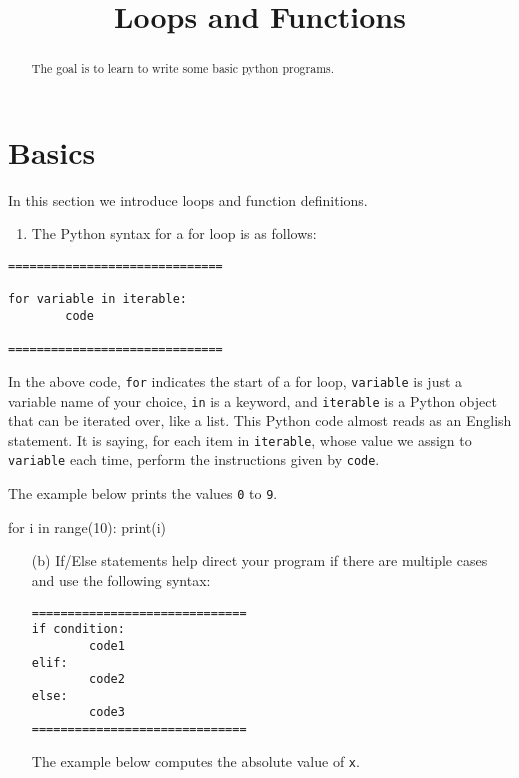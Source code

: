 \documentclass{ximera}
\title{Loops and Functions}
\begin{document}
\begin{abstract}
The goal is to learn to write some basic python programs.
\end{abstract}
\maketitle

\section{Basics}

In this section we introduce loops and function definitions.

	\begin{enumerate}
        	\item The Python syntax for a for loop is as follows:
	\end{enumerate}
\begin{verbatim}
==============================

for variable in iterable:
        code

==============================
\end{verbatim}

In the above code, \verb|for| indicates the start of a for loop, \verb|variable| is just a variable name of your choice, \verb|in| is a keyword, and \verb|iterable| is a Python object that can be iterated over, like a list. This Python code almost reads as an English statement. It is saying, for each item in \verb|iterable|, whose value we assign to \verb|variable| each time, perform the instructions given by \verb|code|.

The example below prints the values \verb|0| to \verb|9|.

\begin{sageCell}
for i in range(10):
        print(i)
\end{sageCell}

	\begin{enumerate}
		\item[(b)] If/Else statements help direct your program if there are multiple cases and use the following syntax:
\begin{verbatim}
==============================
if condition:
        code1
elif:
        code2
else:
        code3
==============================
\end{verbatim}

The example below computes the absolute value of \verb|x|.
	\end{enumerate}
\end{document}
